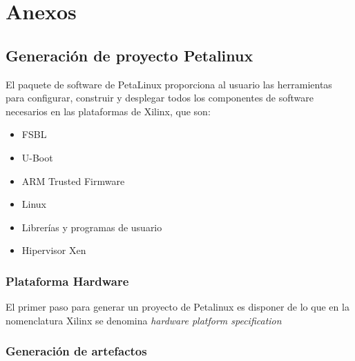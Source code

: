 \chapter{Anexos}

\section{Generación de proyecto Petalinux} \label{petalinux}

El paquete de software de PetaLinux proporciona al usuario las herramientas para configurar, construir y desplegar todos los componentes de software necesarios en las plataformas de Xilinx, que son:
\begin{itemize}
  \item \acrshort{FSBL}
  \item U-Boot
  \item ARM Trusted Firmware
  \item Linux
  \item Librerías y programas de usuario
  \item Hipervisor Xen
\end{itemize}


\subsection{Plataforma Hardware}
El primer paso para generar un proyecto de Petalinux es disponer de lo que en la nomenclatura Xilinx se denomina \textit{hardware platform specification}

\subsection{Generación de artefactos}
